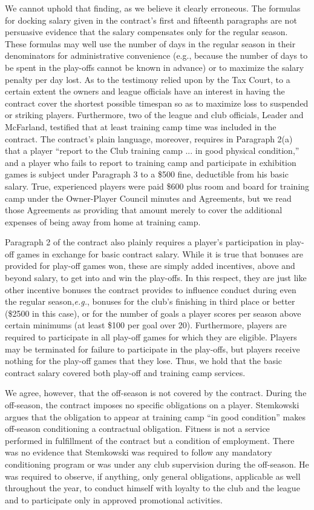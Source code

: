 \begin{select}
We cannot uphold that finding, as we believe it clearly erroneous. The formulas for docking salary given in the contract's first and fifteenth paragraphs are not persuasive evidence that the salary compensates only for the regular season. These formulas may well use the number of days in the regular season in their denominators for administrative convenience (e.g., because the number of days to be spent in the play-offs cannot be known in advance) or to maximize the salary penalty per day lost. As to the testimony relied upon by the Tax Court, to a certain extent the owners and league officials have an interest in having the contract cover the shortest possible timespan so as to maximize loss to suspended or striking players. Furthermore, two of the league and club officials, Leader and McFarland, testified that at least training camp time was included in the contract. The contract's plain language, moreover, requires in Paragraph 2(a) that a player ``report to the Club training camp ... in good physical condition,'' and a player who fails to report to training camp and participate in exhibition games is subject under Paragraph 3 to a \$500 fine, deductible from his basic salary. True, experienced players were paid \$600 plus room and board for training camp under the Owner-Player Council minutes and Agreements, but we read those Agreements as providing that amount merely to cover the additional expenses of being away from home at training camp.

Paragraph 2 of the contract also plainly requires a player's participation in play-off games in exchange for basic contract salary. While it is true that bonuses are provided for play-off games won, these are simply added incentives, above and beyond salary, to get into and win the play-offs. In this respect, they are just like other incentive bonuses the contract provides to influence conduct during even the regular season,\emph{e.g.}, bonuses for the club's finishing in third place or better (\$2500 in this case), or for the number of goals a player scores per season above certain minimums (at least \$100 per goal over 20). Furthermore, players are required to participate in all play-off games for which they are eligible. Players may be terminated for failure to participate in the play-offs, but players receive nothing for the play-off games that they lose. Thus, we hold that the basic contract salary covered both play-off and training camp services.

We agree, however, that the off-season is not covered by the contract. During the off-season, the contract imposes no specific obligations on a player. Stemkowski argues that the obligation to appear at training camp ``in good condition'' makes off-season conditioning a contractual obligation. Fitness is not a service performed in fulfillment of the contract but a condition of employment. There was no evidence that Stemkowski was required to follow any mandatory conditioning program or was under any club supervision during the off-season. He was required to observe, if anything, only general obligations, applicable as well throughout the year, to conduct himself with loyalty to the club and the league and to participate only in approved promotional activities. 


\end{select}
